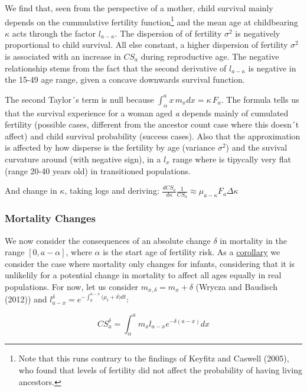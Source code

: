\documentclass[
]{article}
\begin{document}
We find that, seen from the perspective of a mother, child survival
mainly depends on the cummulative fertility function\footnote{Note that
  this runs contrary to the findings of Keyfitz and Caswell (2005), who
  found that levels of fertility did not affect the probability of
  having living ancestors.} and the mean age at childbearing \(\kappa\)
acts through the factor \(l_{a-\kappa}\). The dispersion of of fertility
\(\sigma^2\) is negatively proportional to child survival. All else
constant, a higher dispersion of fertility \(\sigma^2\) is associated
with an increase in \(CS_a\) during reproductive age. The negative
relationship stems from the fact that the second derivative of
\(l_{a-\kappa}\) is negative in the 15-49 age range, given a concave
downwards survival function.

The second Taylor´s term is null because
\(\int_{\alpha}^a{x \, m_{x}dx} = \kappa \, F_a\). The formula tells us
that the survival experience for a woman aged \emph{a} depends mainly of
cumulated fertility (possible cases, different from the ancestor count
case where this doesn´t affect) and child survival probability (success
cases). Also that the approximation is affected by how disperse is the
fertility by age (variance \(\sigma^2\)) and the suvival curvature
around (with negative sign), in a \(l_x\) range where is tipycally very
flat (range 20-40 years old) in transitioned populations.

And change in \(\kappa\), taking logs and deriving:
\(\frac{dCS_a}{d\kappa}\frac{1}{CS_a} \approx \mu_{a-\kappa}F_a \Delta\kappa\)

\hypertarget{mortality-changes}{%
\subsubsection{Mortality Changes}\label{mortality-changes}}

We now consider the consequences of an absolute change \(\delta\) in
mortality in the range \([0,a-\alpha]\), where \(\alpha\) is the start
age of fertility risk. As a \protect\hyperlink{Corollary}{corollary} we
consider the case where mortality only changes for infants, considering
that it is unlikelily for a potential change in mortality to affect all
ages equally in real populations. For now, let us consider
\(m_{x,\delta}=m_{x}+\delta\) (Wrycza and Baudisch (2012)) and
\(l_{a-x}^\delta = e^{-\int_{0}^{a-x}{(\mu_t+\delta})dt}\):

\[CS_{a}^\delta = \int_{\alpha}^{a}m_{x} l_{a-x} e^{-\delta (a-x)} dx\]
\end{document}
